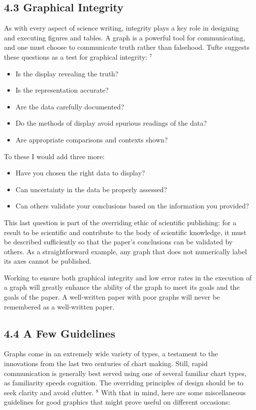 \subsection*{4.3 Graphical Integrity}
As with every aspect of science writing, integrity plays a key role in designing and executing figures and tables. A graph is a powerful tool for communicating, and one must choose to communicate truth rather than falsehood. Tufte suggests these questions as a test for graphical integrity: ${ }^{7}$

\begin{itemize}
  \item Is the display revealing the truth?
  \item Is the representation accurate?
  \item Are the data carefully documented?
  \item Do the methods of display avoid spurious readings of the data?
  \item Are appropriate comparisons and contexts shown?
\end{itemize}

To these I would add three more:

\begin{itemize}
  \item Have you chosen the right data to display?
  \item Can uncertainty in the data be properly assessed?
  \item Can others validate your conclusions based on the information you provided?
\end{itemize}

This last question is part of the overriding ethic of scientific publishing: for a result to be scientific and contribute to the body of scientific knowledge, it must be described sufficiently so that the paper's conclusions can be validated by others. As a straightforward example, any graph that does not numerically label its axes cannot be published.

Working to ensure both graphical integrity and low error rates in the execution of a graph will greatly enhance the ability of the graph to meet its goals and the goals of the paper. A well-written paper with poor graphs will never be remembered as a well-written paper.

\subsection*{4.4 A Few Guidelines}
Graphs come in an extremely wide variety of types, a testament to the innovations from the last two centuries of chart making. Still, rapid communication is generally best served using one of several familiar chart types, as familiarity speeds cognition. The overriding principles of design should be to seek clarity and avoid clutter. ${ }^{8}$ With that in mind, here are some miscellaneous guidelines for good graphics that might prove useful on different occasions:

